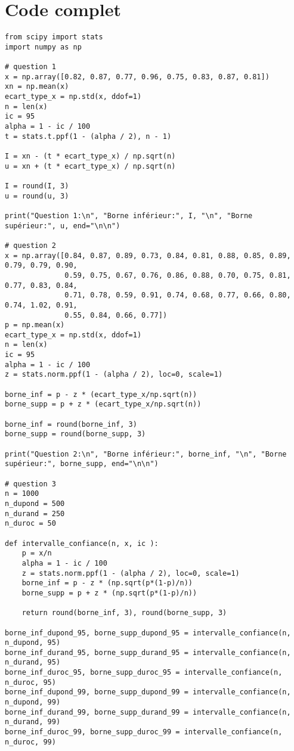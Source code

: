 \section{Code complet}
\begin{lstlisting}[style=myPython, caption=Code Python complet TP3, frame=lines]
from scipy import stats
import numpy as np

# question 1
x = np.array([0.82, 0.87, 0.77, 0.96, 0.75, 0.83, 0.87, 0.81])
xn = np.mean(x)
ecart_type_x = np.std(x, ddof=1)
n = len(x)
ic = 95
alpha = 1 - ic / 100
t = stats.t.ppf(1 - (alpha / 2), n - 1)

I = xn - (t * ecart_type_x) / np.sqrt(n)
u = xn + (t * ecart_type_x) / np.sqrt(n)

I = round(I, 3)
u = round(u, 3)

print("Question 1:\n", "Borne inférieur:", I, "\n", "Borne supérieur:", u, end="\n\n")

# question 2
x = np.array([0.84, 0.87, 0.89, 0.73, 0.84, 0.81, 0.88, 0.85, 0.89, 0.79, 0.79, 0.90,
              0.59, 0.75, 0.67, 0.76, 0.86, 0.88, 0.70, 0.75, 0.81, 0.77, 0.83, 0.84, 
              0.71, 0.78, 0.59, 0.91, 0.74, 0.68, 0.77, 0.66, 0.80, 0.74, 1.02, 0.91,
              0.55, 0.84, 0.66, 0.77])
p = np.mean(x)
ecart_type_x = np.std(x, ddof=1)
n = len(x)
ic = 95
alpha = 1 - ic / 100
z = stats.norm.ppf(1 - (alpha / 2), loc=0, scale=1)

borne_inf = p - z * (ecart_type_x/np.sqrt(n))
borne_supp = p + z * (ecart_type_x/np.sqrt(n))

borne_inf = round(borne_inf, 3)
borne_supp = round(borne_supp, 3)

print("Question 2:\n", "Borne inférieur:", borne_inf, "\n", "Borne supérieur:", borne_supp, end="\n\n")

# question 3
n = 1000
n_dupond = 500
n_durand = 250
n_duroc = 50

def intervalle_confiance(n, x, ic ):
    p = x/n
    alpha = 1 - ic / 100
    z = stats.norm.ppf(1 - (alpha / 2), loc=0, scale=1)
    borne_inf = p - z * (np.sqrt(p*(1-p)/n))
    borne_supp = p + z * (np.sqrt(p*(1-p)/n))

    return round(borne_inf, 3), round(borne_supp, 3)

borne_inf_dupond_95, borne_supp_dupond_95 = intervalle_confiance(n, n_dupond, 95)
borne_inf_durand_95, borne_supp_durand_95 = intervalle_confiance(n, n_durand, 95)
borne_inf_duroc_95, borne_supp_duroc_95 = intervalle_confiance(n, n_duroc, 95)
borne_inf_dupond_99, borne_supp_dupond_99 = intervalle_confiance(n, n_dupond, 99)
borne_inf_durand_99, borne_supp_durand_99 = intervalle_confiance(n, n_durand, 99)
borne_inf_duroc_99, borne_supp_duroc_99 = intervalle_confiance(n, n_duroc, 99)


\end{lstlisting}
